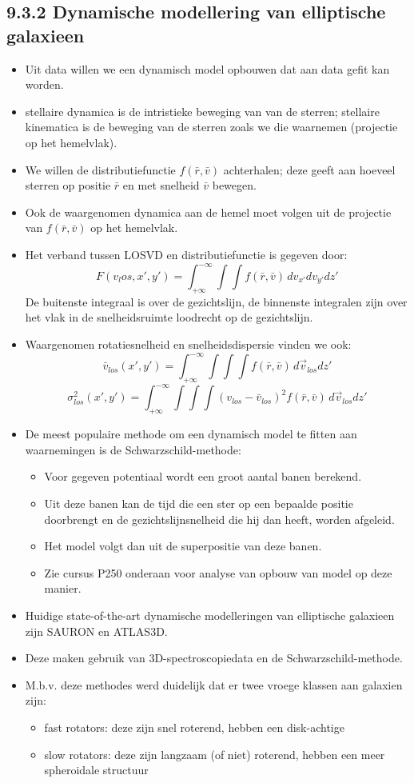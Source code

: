 \documentclass[10pt,a4paper]{article}
\begin{document}
\subsection*{9.3.2 Dynamische modellering van elliptische galaxieen}
\begin{itemize}
  \item Uit data willen we een dynamisch model opbouwen dat aan data gefit kan worden.
  \item stellaire dynamica is de intristieke beweging van van de sterren; stellaire kinematica is de beweging van de sterren zoals we die waarnemen (projectie op het hemelvlak).
  \item We willen de distributiefunctie $f(\bar{r}, \bar{v})$ achterhalen; deze geeft aan hoeveel sterren op positie $\bar{r}$ en met snelheid $\bar{v}$ bewegen.
  \item Ook de waargenomen dynamica aan de hemel moet volgen uit de projectie van $f(\bar{r}, \bar{v})$ op het hemelvlak.
  \item Het verband tussen LOSVD en distributiefunctie is gegeven door:
  \[
  F(v_los, x', y') = \int^{-\infty}_{+\infty} \int \int f(\bar{r}, \bar{v})\,dv_{x'}dv_{y'}dz'
  \]
  De buitenste integraal is over de gezichtslijn, de binnenste integralen zijn over het vlak in de snelheidsruimte loodrecht op de gezichtslijn.
  \item Waargenomen rotatiesnelheid en snelheidsdispersie vinden we ook:
  \[
  \bar{v}_{los}(x', y')=\int^{-\infty}_{+\infty} \int \int \int f(\bar{r}, \bar{v})\,d\vec{v}_{los}dz'
  \]
  \[
  \sigma^2_{los}(x', y')=\int^{-\infty}_{+\infty} \int \int \int (v_{los}-\bar{v}_{los})^2f(\bar{r}, \bar{v})\,d\vec{v}_{los}dz'
  \]
  \item De meest populaire methode om een dynamisch model te fitten aan waarnemingen is de Schwarzschild-methode:
  \begin{itemize}
    \item Voor gegeven potentiaal wordt een groot aantal banen berekend.
    \item Uit deze banen kan de tijd die een ster op een bepaalde positie doorbrengt en de gezichtslijnsnelheid die hij dan heeft, worden afgeleid.
    \item Het model volgt dan uit de superpositie van deze banen.
    \item Zie cursus P250 onderaan voor analyse van opbouw van model op deze manier.
  \end{itemize}
  \item Huidige state-of-the-art dynamische modelleringen van elliptische galaxieen zijn SAURON en ATLAS3D.
  \item Deze maken gebruik van 3D-spectroscopiedata en de Schwarzschild-methode.
  \item M.b.v. deze methodes werd duidelijk dat er twee vroege klassen aan galaxien zijn:
  \begin{itemize}
    \item fast rotators: deze zijn snel roterend, hebben een disk-achtige
    \item slow rotators: deze zijn langzaam (of niet) roterend, hebben een meer spheroidale structuur
  \end{itemize}
\end{itemize}
\end{document}
